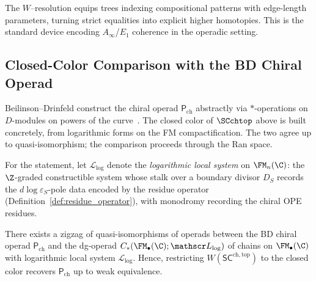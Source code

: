 \begin{remark}
The $W$–resolution equips trees indexing compositional patterns with edge-length parameters, turning strict equalities into explicit higher homotopies. This is the standard device encoding $A_\infty$/$E_1$ coherence in the operadic setting.
\end{remark}

\subsection{Closed-Color Comparison with the BD Chiral Operad}
\label{subsec:BD-compare}

Beilinson--Drinfeld construct the chiral operad $\mathsf P_{\mathrm{ch}}$ abstractly via $\ast$-operations on $D$-modules on powers of the curve~\cite[\S3.4]{BD04}. The closed color of $\SCchtop$ above is built concretely, from logarithmic forms on the FM compactification. The two agree up to quasi-isomorphism; the comparison proceeds through the Ran space.

For the statement, let $\mathscr L_{\log}$ denote the \emph{logarithmic local system} on $\FM_n(\C)$: the $\Z$-graded constructible system whose stalk over a boundary divisor $D_S$ records the $d\log\varepsilon_S$-pole data encoded by the residue operator (Definition~\ref{def:residue_operator}), with monodromy recording the chiral OPE residues.

\begin{theorem}
\label{thm:closed-BD}
There exists a zigzag of quasi-isomorphisms of operads between the BD chiral operad $\mathsf P_{\mathrm{ch}}$ and the dg-operad $C_\ast(\FM_\bullet(\C);\mathscr L_{\log})$ of chains on $\FM_\bullet(\C)$ with logarithmic local system $\mathscr L_{\log}$. Hence, restricting $W(\mathsf{SC}^{\mathrm{ch,top}})$ to the closed color recovers $\mathsf P_{\mathrm{ch}}$ up to weak equivalence.
\end{theorem}

